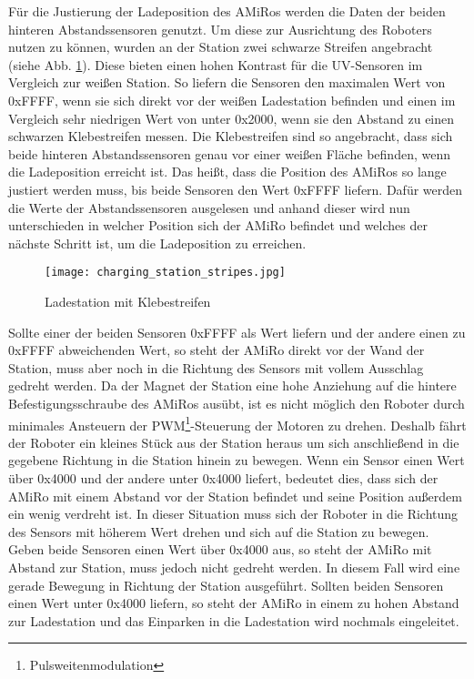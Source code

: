 Für die Justierung der Ladeposition des AMiRos werden die Daten der beiden hinteren Abstandssensoren genutzt. Um diese zur Ausrichtung des Roboters nutzen zu können, wurden an der Station zwei schwarze Streifen angebracht (siehe Abb. \ref{fig:charging_station}). Diese bieten einen hohen Kontrast für die UV-Sensoren im Vergleich zur weißen Station. So liefern die Sensoren den maximalen Wert von 0xFFFF, wenn sie sich direkt vor der weißen Ladestation befinden und einen im Vergleich sehr niedrigen Wert von unter 0x2000, wenn sie den Abstand zu einen schwarzen Klebestreifen messen. 
Die Klebestreifen sind so angebracht, dass sich beide hinteren Abstandssensoren genau vor einer weißen Fläche befinden, wenn die Ladeposition erreicht ist. 
Das heißt, dass die Position des AMiRos so lange justiert werden muss, bis beide Sensoren den Wert 0xFFFF liefern. 
Dafür werden die Werte der Abstandssensoren ausgelesen und anhand dieser wird nun unterschieden in welcher Position sich der AMiRo befindet und welches der nächste Schritt ist, um die Ladeposition zu erreichen. 

\begin{figure}[]
	\begin{center}
		\texttt{[image: charging\_station\_stripes.jpg]} 	
		\caption{Ladestation mit Klebestreifen}
		\label{fig:charging_station}
	\end{center}
\end{figure}

Sollte einer der beiden Sensoren 0xFFFF als Wert liefern und der andere einen zu 0xFFFF abweichenden Wert, so steht der AMiRo direkt vor der Wand der Station, muss aber noch in die Richtung des Sensors mit vollem Ausschlag gedreht werden. Da der Magnet der Station eine hohe Anziehung auf die hintere Befestigungsschraube des AMiRos ausübt, ist es nicht möglich den Roboter durch minimales Ansteuern der PWM\footnote{Pulsweitenmodulation}-Steuerung der Motoren zu drehen. Deshalb fährt der Roboter ein kleines Stück aus der Station heraus um sich anschließend in die gegebene Richtung in die Station hinein zu bewegen. 
Wenn ein Sensor einen Wert über 0x4000 und der andere unter 0x4000 liefert, bedeutet dies, dass sich der AMiRo mit einem Abstand vor der Station befindet und seine Position außerdem ein wenig verdreht ist. In dieser Situation muss sich der Roboter in die Richtung des Sensors mit höherem Wert drehen und sich auf die Station zu bewegen. 
Geben beide Sensoren einen Wert über 0x4000 aus, so steht der AMiRo mit Abstand zur Station, muss jedoch nicht gedreht werden. In diesem Fall wird eine gerade Bewegung in Richtung der Station ausgeführt. 
Sollten beiden Sensoren einen Wert unter 0x4000 liefern, so steht der AMiRo in einem zu hohen Abstand zur Ladestation und das Einparken in die Ladestation wird nochmals eingeleitet.

